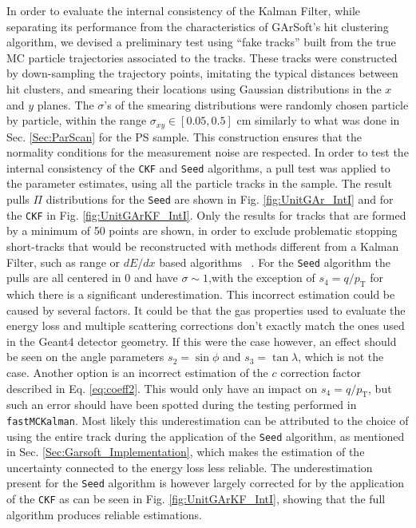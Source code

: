 In order to evaluate the internal consistency of the Kalman Filter, while separating its performance from the characteristics of GArSoft's hit clustering algorithm, we devised a preliminary test using \enquote{fake tracks} built from the true MC particle trajectories associated to the tracks. These tracks were constructed by down-sampling the trajectory points, imitating the typical distances between hit clusters, and smearing their locations using Gaussian  distributions in the $x$ and $y$ planes. The $\sigma$'s of the smearing distributions were randomly chosen particle by particle, within the range $\sigma_{xy}\in [0.05,0.5]$ cm similarly to what was done in Sec. \ref{Sec:ParScan} for the PS sample. This construction ensures that the normality conditions for the measurement noise are respected. In order to test the internal consistency of the \texttt{CKF} and \texttt{Seed} algorithms, a pull test was applied to the parameter estimates, using all the particle tracks in the sample. The result pulls $\Pi$ distributions for the \texttt{Seed} are shown in Fig. \ref{fig:UnitGAr_IntI} and for the \texttt{CKF} in Fig. \ref{fig:UnitGArKF_IntI}. Only the results for tracks that are formed by a minimum of 50 points are shown, in order to exclude problematic stopping short-tracks that would be reconstructed with methods different from a Kalman Filter, such as range or $dE/dx$ based algorithms ~\cite{RevModPhys.82.1419}. For the \texttt{Seed} algorithm the pulls are all centered in 0 and have $\sigma\sim 1$,with the exception of $s_4=q/p_\textrm{T}$ for which there is a significant underestimation. This incorrect estimation could be caused by several factors. It could be that the gas properties used to evaluate the energy loss and multiple scattering corrections don't exactly match the ones used in the Geant4 detector geometry. If this were the case however, an effect should be seen on the angle parameters $s_2=\sin\phi$ and $s_3=\tan\lambda$, which is not the case. Another option is an incorrect estimation of the $c$ correction factor described in Eq. \ref{eq:coeff2}. This would only have an impact on $s_4=q/p_\textrm{T}$, but such an error should have been spotted during the testing performed in \texttt{fastMCKalman}. Most likely this underestimation can be attributed to the choice of using the entire track during the application of the \texttt{Seed} algorithm, as mentioned in Sec. \ref{Sec:Garsoft_Implementation}, which makes the estimation of the uncertainty connected to the energy loss less reliable. The underestimation present for the \texttt{Seed} algorithm is however largely corrected for by the application of the \texttt{CKF} as can be seen in Fig. \ref{fig:UnitGArKF_IntI}, showing that the full algorithm produces reliable estimations.

